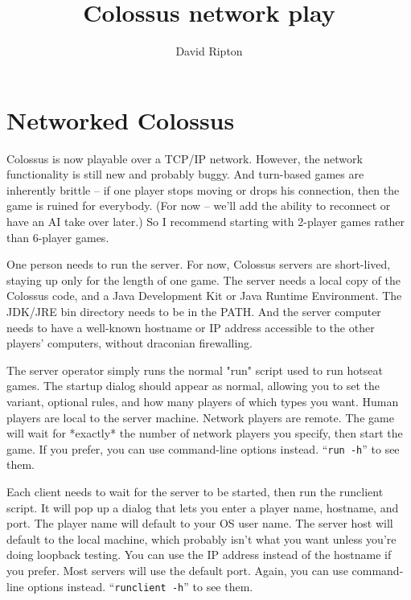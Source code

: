 \documentclass{article}
\begin{document}

\title{Colossus network play}

\author{David Ripton}

\maketitle

\section{Networked Colossus}

Colossus is now playable over a TCP/IP network.  However, the network 
functionality is still new and probably buggy.  And turn-based games
are inherently brittle -- if one player stops moving or drops his 
connection, then the game is ruined for everybody.  (For now -- we'll
add the ability to reconnect or have an AI take over later.)  So I
recommend starting with 2-player games rather than 6-player games.

One person needs to run the server.  For now, Colossus servers are 
short-lived, staying up only for the length of one game.  The server
needs a local copy of the Colossus code, and a Java Development Kit 
or Java Runtime Environment.  The JDK/JRE bin directory needs to be 
in the PATH.  And the server computer needs to have a well-known 
hostname or IP address accessible to the other players' computers, 
without draconian firewalling.

The server operator simply runs the normal "run" script used to run 
hotseat games.  The startup dialog should appear as normal, allowing 
you to set the variant, optional rules, and how many players of which 
types you want.  Human players are local to the server machine.  
Network players are remote.  The game will wait for *exactly* the 
number of network players you specify, then start the game.  If you 
prefer, you can use command-line options instead.  ``\texttt{run -h}'' 
to see them.

Each client needs to wait for the server to be started, then run
the runclient script.  It will pop up a dialog that lets you enter
a player name, hostname, and port.  The player name will default to 
your OS user name.  The server host will default to the local machine, 
which probably isn't what you want unless you're doing loopback testing.  
You can use the IP address instead of the hostname if you prefer.  Most
servers will use the default port.  Again, you can use command-line 
options instead.  ``\texttt{runclient -h}'' to see them.
\end{document}

